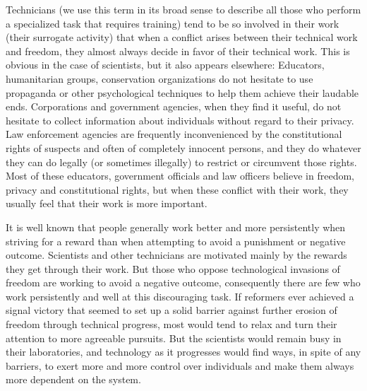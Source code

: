  Technicians (we use this term in its broad sense to describe all those who perform a specialized task that requires training) tend to be so involved in their work (their surrogate activity) that when a conflict arises between their technical work and freedom, they almost always decide in favor of their technical work. This is obvious in the case of scientists, but it also appears elsewhere: Educators, humanitarian groups, conservation organizations do not hesitate to use propaganda or other psychological techniques to help them achieve their laudable ends. Corporations and government agencies, when they find it useful, do not hesitate to collect information about individuals without regard to their privacy. Law enforcement agencies are frequently inconvenienced by the constitutional rights of suspects and often of completely innocent persons, and they do whatever they can do legally (or sometimes illegally) to restrict or circumvent those rights. Most of these educators, government officials and law officers believe in freedom, privacy and constitutional rights, but when these conflict with their work, they usually feel that their work is more important.

 It is well known that people generally work better and more persistently when striving for a reward than when attempting to avoid a punishment or negative outcome. Scientists and other technicians are motivated mainly by the rewards they get through their work. But those who oppose technological invasions of freedom are working to avoid a negative outcome, consequently there are few who work persistently and well at this discouraging task. If reformers ever achieved a signal victory that seemed to set up a solid barrier against further erosion of freedom through technical progress, most would tend to relax and turn their attention to more agreeable pursuits. But the scientists would remain busy in their laboratories, and technology as it progresses would find ways, in spite of any barriers, to exert more and more control over individuals and make them always more dependent on the system.

